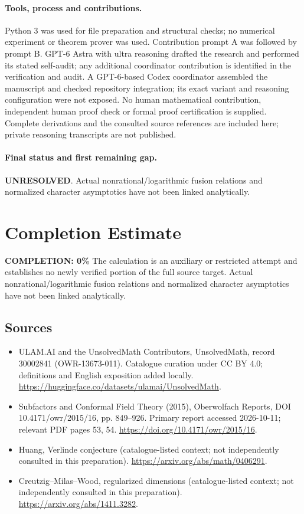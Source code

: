 \documentclass[11pt]{article}
\begin{document}
\paragraph{Tools, process and contributions.}
Python 3 was used for file preparation and structural checks; no numerical experiment or theorem prover was used. Contribution prompt A was followed by prompt B. GPT-6 Astra with ultra reasoning drafted the research and performed its stated self-audit; any additional coordinator contribution is identified in the verification and audit. A GPT-6-based Codex coordinator assembled the manuscript and checked repository integration; its exact variant and reasoning configuration were not exposed. No human mathematical contribution, independent human proof check or formal proof certification is supplied. Complete derivations and the consulted source references are included here; private reasoning transcripts are not published.

\paragraph{Final status and first remaining gap.}
\textbf{UNRESOLVED}. Actual nonrational/logarithmic fusion relations and normalized character asymptotics have not been linked analytically.

\section{Completion Estimate}
\noindent\textbf{COMPLETION: 0\%}
The calculation is an auxiliary or restricted attempt and establishes no newly verified portion of the full source target. Actual nonrational/logarithmic fusion relations and normalized character asymptotics have not been linked analytically.

\subsection{Sources}
\begin{itemize}
\item[\hypertarget{source:30002841:1}{S1}] ULAM.AI and the UnsolvedMath Contributors, UnsolvedMath, record 30002841 (OWR-13673-011). Catalogue curation under CC BY 4.0; definitions and English exposition added locally.
\url{https://huggingface.co/datasets/ulamai/UnsolvedMath}.
\item[\hypertarget{source:30002841:2}{S2}] Subfactors and Conformal Field Theory (2015), Oberwolfach Reports, DOI 10.4171/owr/2015/16, pp. 849--926. Primary report accessed 2026-10-11; relevant PDF pages 53, 54.
\url{https://doi.org/10.4171/owr/2015/16}.
\item[\hypertarget{source:30002841:3}{S3}] Huang, Verlinde conjecture (catalogue-listed context; not independently consulted in this preparation).
\url{https://arxiv.org/abs/math/0406291}.
\item[\hypertarget{source:30002841:4}{S4}] Creutzig--Milas--Wood, regularized dimensions (catalogue-listed context; not independently consulted in this preparation).
\url{https://arxiv.org/abs/1411.3282}.
\end{itemize}
\label{end:30002841}
\end{document}
